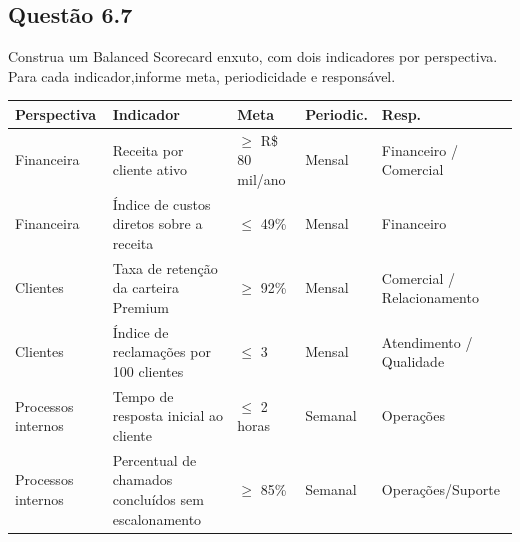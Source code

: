 \subsection{Questão 6.7}
Construa um Balanced Scorecard enxuto, com dois indicadores por perspectiva. Para cada indicador,informe meta, periodicidade e responsável.
\hspace*{-2cm}
\begin{table}[htbp]                                                            
 \centering                                                                     
  \begin{tabular}{|p{3cm}|p{3cm}|p{2cm}|p{2cm}|p{3cm}|}                      
 \hline                                                                         
 \textbf{Perspectiva} & \textbf{Indicador} & \textbf{Meta} &                    
 \textbf{Periodic.} & \textbf{Resp.} \\                               
 \hline                                                                         
 Financeira & Receita por cliente ativo & $\geq$ R\$ 80 mil/ano & Mensal &      
 Financeiro / Comercial \\                                                        
 \hline                                                                         
 Financeira & Índice de custos diretos sobre a receita & $\leq$ 49\% & Mensal & 
 Financeiro \\                                                                  
 \hline                                                                         
 Clientes & Taxa de retenção da carteira Premium & $\geq$ 92\% & Mensal &       
 Comercial / Relacionamento \\                                                    
 \hline                                                                         
 Clientes & Índice de reclamações por 100 clientes & $\leq$ 3 & Mensal &        
 Atendimento / Qualidade \\                                                       
 \hline                                                                         
 Processos internos & Tempo de resposta inicial ao cliente & $\leq$ 2 horas &   
 Semanal & Operações \\                                                         
 \hline                                                                         
 Processos internos & Percentual de chamados concluídos sem escalonamento &     
 $\geq$ 85\% & Semanal & Operações/Suporte \\                                   

\end{tabular}
\end{table}
